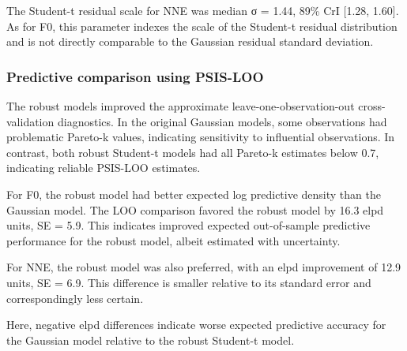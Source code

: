 \documentclass[
  english,
  man,floatsintext]{apa6}
\begin{document}
The Student-t residual scale for NNE was median σ = 1.44, 89\% CrI {[}1.28, 1.60{]}. As for F0, this parameter indexes the scale of the Student-t residual distribution and is not directly comparable to the Gaussian residual standard deviation.

\subsubsection{Predictive comparison using PSIS-LOO}\label{predictive-comparison-using-psis-loo}

The robust models improved the approximate leave-one-observation-out cross-validation diagnostics. In the original Gaussian models, some observations had problematic Pareto-k values, indicating sensitivity to influential observations. In contrast, both robust Student-t models had all Pareto-k estimates below 0.7, indicating reliable PSIS-LOO estimates.

For F0, the robust model had better expected log predictive density than the Gaussian model. The LOO comparison favored the robust model by 16.3 elpd units, SE = 5.9. This indicates improved expected out-of-sample predictive performance for the robust model, albeit estimated with uncertainty.

For NNE, the robust model was also preferred, with an elpd improvement of 12.9 units, SE = 6.9. This difference is smaller relative to its standard error and correspondingly less certain.

\begin{table}[!h]
\centering
\caption{\label{tab:table-psis-loo-robust-comparison}PSIS-LOO predictive comparison of Gaussian and robust Student-t main-effects models.}
\centering
{}
\end{table}

Here, negative elpd differences indicate worse expected predictive accuracy for the Gaussian model relative to the robust Student-t model.
\end{document}
